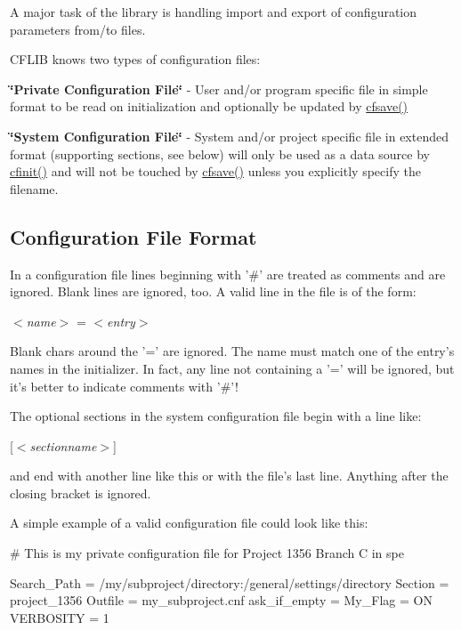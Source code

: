 A major task of the library is handling import and export of configuration parameters from/to files.

C\-F\-L\-I\-B knows two types of configuration files\-:


\begin{DoxyItemize}
\item {\bfseries \char`\"{}\-Private Configuration File\char`\"{}} -\/ User and/or program specific file in simple format to be read on initialization and optionally be updated by \hyperlink{group__setting__saving_gaad7e1267cd904b4480a0eeaeb03b5f75}{cfsave()}
\end{DoxyItemize}


\begin{DoxyItemize}
\item {\bfseries \char`\"{}\-System Configuration File\char`\"{}} -\/ System and/or project specific file in extended format (supporting sections, see below) will only be used as a data source by \hyperlink{group__cflib__core_ga64fb341565c2ddfccd6669e5e6265a8a}{cfinit()} and will not be touched by \hyperlink{group__setting__saving_gaad7e1267cd904b4480a0eeaeb03b5f75}{cfsave()} unless you explicitly specify the filename.
\end{DoxyItemize}\hypertarget{config_files_config_format}{}\subsection{Configuration File Format}\label{config_files_config_format}
In a configuration file lines beginning with {\ttfamily '\#'} are treated as comments and are ignored. Blank lines are ignored, too. A valid line in the file is of the form\-:

$<${\itshape name$>$\/} = $<${\itshape entry$>$\/} 

Blank chars around the {\ttfamily '='} are ignored. The name must match one of the entry's names in the initializer. In fact, any line not containing a {\ttfamily '='} will be ignored, but it's better to indicate comments with {\ttfamily '\#'!} 

The optional sections in the system configuration file begin with a line like\-:

\mbox{[}$<${\itshape sectionname$>$\/}\mbox{]}

and end with another line like this or with the file's last line. Anything after the closing bracket is ignored.

A simple example of a valid configuration file could look like this\-: 
\begin{DoxyCode}
 # This is my private configuration file for Project 1356 Branch C in spe

 Search_Path  = /my/subproject/directory:/general/settings/directory
 Section      = project_1356
 Outfile      = my_subproject.cnf
 ask_if_empty =
 My_Flag =      ON
 VERBOSITY = 1
\end{DoxyCode}


